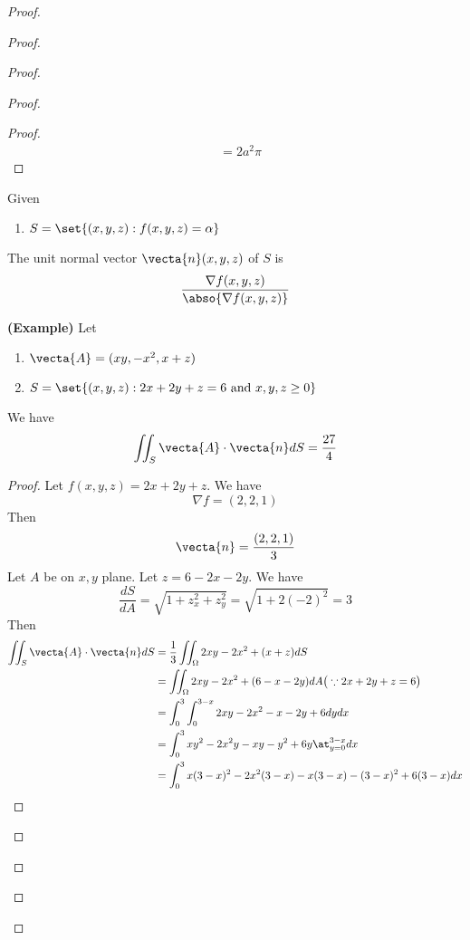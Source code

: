 \documentclass{report}
\begin{document}
\begin{proof}
\begin{proof}
\begin{proof}
\begin{proof}
\begin{proof}
\begin{align*}
&=2a^2\pi
\end{align*}
\end{proof}
\begin{lemma}
\label{10.1.5}
Given 
\begin{enumerate}[label=(\alph*)]
  \item $S=\set{(x,y,z):f(x,y,z)=\alpha }$
\end{enumerate}
The unit normal vector $\vecta{n}(x,y,z)$ of $S$ is 
 \begin{align*}
\frac{\nabla f(x,y,z)}{\abso{\nabla f(x,y,z)}}
\end{align*}
\end{lemma}
\begin{theorem}
\label{10.1.6}
\textbf{(Example)} Let 
\begin{enumerate}[label=(\alph*)]
  \item $\vecta{A}=(xy,-x^2,x+z)$ 
  \item $S=\set{(x,y,z):2x+2y+z=6\text{ and }x,y,z\geq 0}$
\end{enumerate}
We have
\begin{equation*}
\iint_S \vecta{A}\cdot \vecta{n}dS=\frac{27}{4}
\end{equation*}
\end{theorem}
\begin{proof}
Let $f(x,y,z)=2x+2y+z$. We have
\begin{equation*}
\nabla f=(2,2,1)
\end{equation*}
Then 
\begin{equation*}
\vecta{n}=\frac{(2,2,1)}{3}
\end{equation*}
Let $A$ be on  $x,y$ plane. Let $z=6-2x-2y$. We have
\begin{equation*}
\frac{dS}{dA}=\sqrt{1+z_x^2+z_y^2}=\sqrt{1+2(-2)^2}=3
\end{equation*}
Then
\begin{align*}
\iint_S \vecta{A}\cdot \vecta{n}dS&=\frac{1}{3}\iint_{\Omega} 2xy-2x^2+(x+z)dS\\
&=\iint_{\Omega} 2xy-2x^2+(6-x-2y)dA \big(\because 2x+2y+z=6\big)\\
&=\int_{0}^3\int_0^{3-x} 2xy-2x^2-x-2y+6 dydx\\
&=\int_0^3 xy^2-2x^2y-xy-y^2+6y\at_{y=0}^{3-x}dx\\
&=\int_0^3 x(3-x)^2-2x^2(3-x)-x(3-x)-(3-x)^2+6(3-x)dx\\

\end{align*}
\end{proof}
\end{proof}
\end{proof}
\end{proof}
\end{proof}
\end{document}
